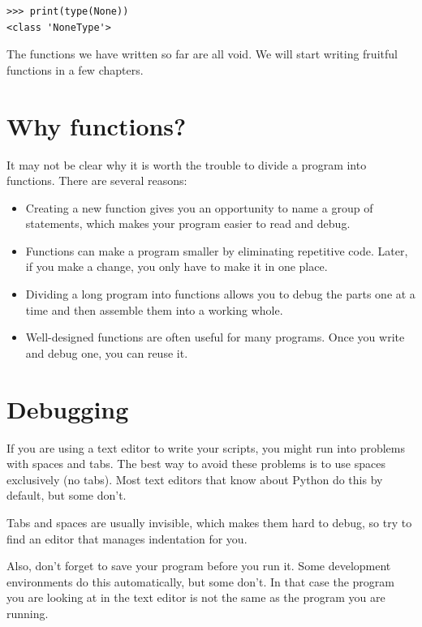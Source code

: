 \documentclass[10pt]{book}
\begin{document}
\beforeverb
\begin{verbatim}
>>> print(type(None))
<class 'NoneType'>
\end{verbatim}
\afterverb
%
The functions we have written so far are all void.  We will start
writing fruitful functions in a few chapters.


\section{Why functions?}

It may not be clear why it is worth the trouble to divide
a program into functions.  There are several reasons:

\begin{itemize}

\item Creating a new function gives you an opportunity to name a group
of statements, which makes your program easier to read and debug.

\item Functions can make a program smaller by eliminating repetitive
code.  Later, if you make a change, you only have
to make it in one place.

\item Dividing a long program into functions allows you to debug the
parts one at a time and then assemble them into a working whole.

\item Well-designed functions are often useful for many programs.
Once you write and debug one, you can reuse it.

\end{itemize}


\section{Debugging}
\label{editor}

If you are using a text editor to write your scripts, you might
run into problems with spaces and tabs.  The best way to avoid
these problems is to use spaces exclusively (no tabs).  Most text
editors that know about Python do this by default, but some
don't.


Tabs and spaces are usually invisible, which makes them
hard to debug, so try to find an editor that manages indentation
for you.

Also, don't forget to save your program before you run it.  Some
development environments do this automatically, but some don't.
In that case the program you are looking at in the text editor
is not the same as the program you are running.
\end{document}
